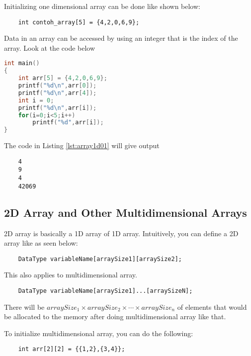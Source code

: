Initializing one dimensional array can be done like shown below:
\begin{verbatim}
    int contoh_array[5] = {4,2,0,6,9};
\end{verbatim}

Data in an array can be accessed by using an integer that is the index of the array. Look at the code below

\begin{lstlisting}[language=c,caption = Contoh Mengakses Array 1D,label=lst:array1d01]
int main()
{
    int arr[5] = {4,2,0,6,9};
    printf("%d\n",arr[0]);
    printf("%d\n",arr[4]);
    int i = 0;
    printf("%d\n",arr[i]);
    for(i=0;i<5;i++)
        printf("%d",arr[i]);
}
\end{lstlisting}

The code in Listing \ref{lst:array1d01} will give output
\begin{verbatim}
    4
    9
    4
    42069
\end{verbatim}

\subsection{2D Array and Other Multidimensional Arrays}%
2D array is basically a 1D array of 1D array. Intuitively, you can define a 2D array like as seen below:
\begin{verbatim}
	DataType variableName[arraySize1][arraySize2];
\end{verbatim}
This also applies to multidimensional array.
\begin{verbatim}
    DataType variableName[arraySize1]...[arraySizeN];
\end{verbatim}
There will be $arraySize_1\times arraySize_2 \times \cdots \times arraySize_n$ of elements that would be allocated to the memory after doing multidimensional array like that.

To initialize multidimensional array, you can do the following:
\begin{verbatim}
    int arr[2][2] = {{1,2},{3,4}};
\end{verbatim}

